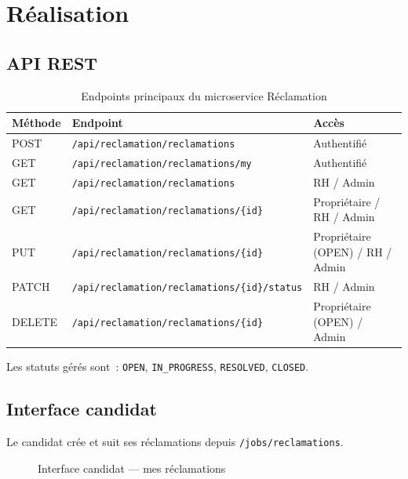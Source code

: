 \section{Réalisation}

\subsection{API REST}

\begin{table}[htbp]
  \centering
  \small
  \caption{Endpoints principaux du microservice Réclamation}
  \label{tab:api-reclamation}
  \begin{tabular}{|l|p{6.2cm}|p{3.8cm}|}
    \hline
    \textbf{Méthode} & \textbf{Endpoint} & \textbf{Accès} \\
    \hline
    POST & \texttt{/api/reclamation/reclamations} & Authentifié \\
    \hline
    GET & \texttt{/api/reclamation/reclamations/my} & Authentifié \\
    \hline
    GET & \texttt{/api/reclamation/reclamations} & RH / Admin \\
    \hline
    GET & \texttt{/api/reclamation/reclamations/\{id\}} & Propriétaire / RH / Admin \\
    \hline
    PUT & \texttt{/api/reclamation/reclamations/\{id\}} & Propriétaire (OPEN) / RH / Admin \\
    \hline
    PATCH & \texttt{/api/reclamation/reclamations/\{id\}/status} & RH / Admin \\
    \hline
    DELETE & \texttt{/api/reclamation/reclamations/\{id\}} & Propriétaire (OPEN) / Admin \\
    \hline
  \end{tabular}
\end{table}

Les statuts gérés sont~: \texttt{OPEN}, \texttt{IN\_PROGRESS},
\texttt{RESOLVED}, \texttt{CLOSED}.


\subsection{Interface candidat}

Le candidat crée et suit ses réclamations depuis
\texttt{/jobs/reclamations}.

\begin{figure}[H]
  \centering
  \caption{Interface candidat --- mes réclamations}
  \label{fig:ui-my-reclamations}
\end{figure}


